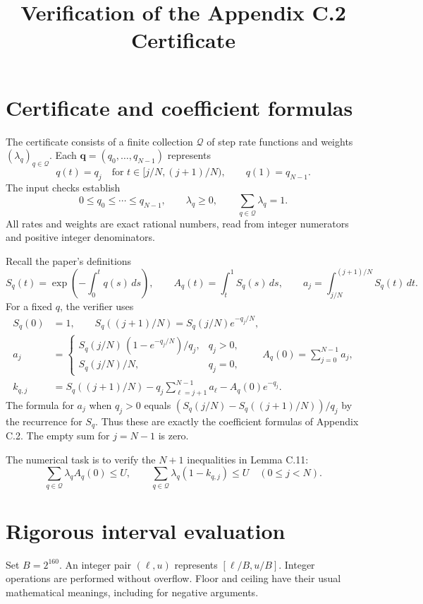 \documentclass[11pt,letterpaper]{article}
\title{Verification of the Appendix C.2 Certificate}
\author{}
\date{}
\begin{document}
\maketitle
\vspace{-2em}

\section{Certificate and coefficient formulas}
The certificate consists of a finite collection $\mathcal Q$ of step rate
functions and weights $(\lambda_q)_{q\in\mathcal Q}$. Each
$\mathbf{q}=(q_0,\ldots,q_{N-1})$ represents
\[
 q(t)=q_j\quad\text{for }t\in[j/N,(j+1)/N),\qquad q(1)=q_{N-1}.
\]
The input checks establish
\[
 0\le q_0\le\cdots\le q_{N-1},\qquad
 \lambda_q\ge0,\qquad \sum_{q\in\mathcal Q}\lambda_q=1.
\]
All rates and weights are exact rational numbers, read from integer
numerators and positive integer denominators.

Recall the paper's definitions
\[
 S_q(t)=\exp\!\left(-\int_0^t q(s)\,ds\right),\qquad
 A_q(t)=\int_t^1 S_q(s)\,ds,\qquad
 a_j=\int_{j/N}^{(j+1)/N}S_q(t)\,dt.
\]
For a fixed $q$, the verifier uses
\begin{align*}
 S_q(0)&=1,\qquad
 S_q((j+1)/N)=S_q(j/N)e^{-q_j/N},\\
 a_j&=
 \begin{cases}
 S_q(j/N)\,(1-e^{-q_j/N})/q_j,&q_j>0,\\
 S_q(j/N)/N,&q_j=0,
 \end{cases}
 \qquad A_q(0)=\sum_{j=0}^{N-1}a_j,\\
 k_{q,j}&=S_q((j+1)/N)-q_j\sum_{\ell=j+1}^{N-1}a_\ell
                           -A_q(0)e^{-q_j}.
\end{align*}
The formula for $a_j$ when $q_j>0$ equals
$(S_q(j/N)-S_q((j+1)/N))/q_j$ by the recurrence for $S_q$.
Thus these are exactly the coefficient formulas of Appendix C.2.
The empty sum for $j=N-1$ is zero.

The numerical task is to verify the $N+1$ inequalities in Lemma C.11:
\[
 \sum_{q\in\mathcal Q}\lambda_q A_q(0)\le U,
 \qquad
 \sum_{q\in\mathcal Q}\lambda_q(1-k_{q,j})\le U
 \quad(0\le j<N).
\]

\newpage
\section{Rigorous interval evaluation}
Set $B=2^{160}$.
An integer pair $(\ell,u)$ represents $[\ell/B,u/B]$. Integer operations
are performed without overflow. Floor and ceiling have their usual
mathematical meanings, including for negative arguments.
\end{document}
